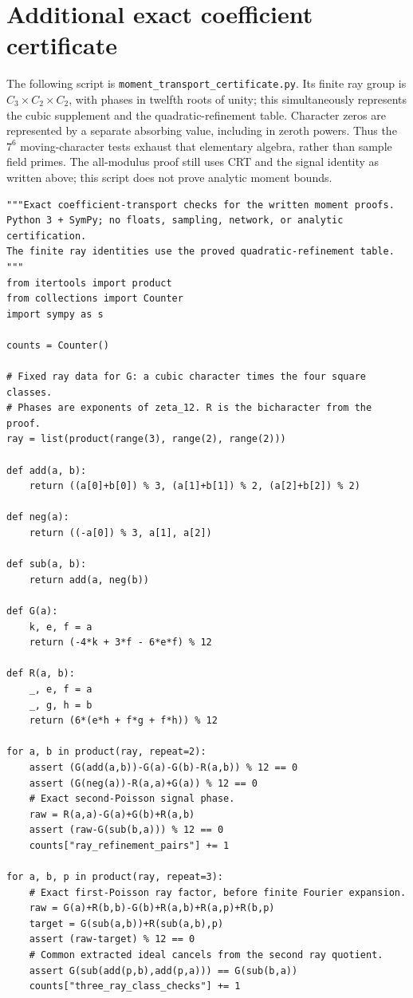 \documentclass[12pt]{article}
\begin{document}
\section{Additional exact coefficient certificate}
The following script is
\texttt{moment\_transport\_certificate.py}.  Its finite ray group
is \(C_3\times C_2\times C_2\), with phases in twelfth roots of
unity; this simultaneously represents the cubic supplement and
the quadratic-refinement table.  Character zeros are represented
by a separate absorbing value, including in zeroth powers.
Thus the \(7^6\) moving-character tests exhaust that elementary
algebra, rather than sample field primes.  The all-modulus proof
still uses CRT and the signal identity as written above; this
script does not prove analytic moment bounds.
\begin{verbatim}
"""Exact coefficient-transport checks for the written moment proofs.
Python 3 + SymPy; no floats, sampling, network, or analytic certification.
The finite ray identities use the proved quadratic-refinement table.
"""
from itertools import product
from collections import Counter
import sympy as s

counts = Counter()

# Fixed ray data for G: a cubic character times the four square classes.
# Phases are exponents of zeta_12. R is the bicharacter from the proof.
ray = list(product(range(3), range(2), range(2)))

def add(a, b):
    return ((a[0]+b[0]) % 3, (a[1]+b[1]) % 2, (a[2]+b[2]) % 2)

def neg(a):
    return ((-a[0]) % 3, a[1], a[2])

def sub(a, b):
    return add(a, neg(b))

def G(a):
    k, e, f = a
    return (-4*k + 3*f - 6*e*f) % 12

def R(a, b):
    _, e, f = a
    _, g, h = b
    return (6*(e*h + f*g + f*h)) % 12

for a, b in product(ray, repeat=2):
    assert (G(add(a,b))-G(a)-G(b)-R(a,b)) % 12 == 0
    assert (G(neg(a))-R(a,a)+G(a)) % 12 == 0
    # Exact second-Poisson signal phase.
    raw = R(a,a)-G(a)+G(b)+R(a,b)
    assert (raw-G(sub(b,a))) % 12 == 0
    counts["ray_refinement_pairs"] += 1

for a, b, p in product(ray, repeat=3):
    # Exact first-Poisson ray factor, before finite Fourier expansion.
    raw = G(a)+R(b,b)-G(b)+R(a,b)+R(a,p)+R(b,p)
    target = G(sub(a,b))+R(sub(a,b),p)
    assert (raw-target) % 12 == 0
    # Common extracted ideal cancels from the second ray quotient.
    assert G(sub(add(p,b),add(p,a))) == G(sub(b,a))
    counts["three_ray_class_checks"] += 1


\end{verbatim}
\end{document}
